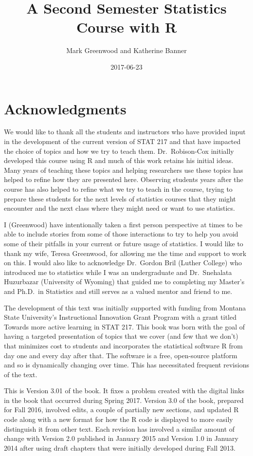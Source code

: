 \documentclass[]{book}
\title{A Second Semester Statistics Course with R}
\author{Mark Greenwood and Katherine Banner}
\date{2017-06-23}
\begin{document}
\maketitle

{
\setcounter{tocdepth}{1}
\tableofcontents
}
\chapter*{Acknowledgments}\label{acknowledgments}

We would like to thank all the students and instructors who have
provided input in the development of the current version of STAT 217 and
that have impacted the choice of topics and how we try to teach them.
Dr.~Robison-Cox initially developed this course using R and much of this
work retains his initial ideas. Many years of teaching these topics and
helping researchers use these topics has helped to refine how they are
presented here. Observing students years after the course has also
helped to refine what we try to teach in the course, trying to prepare
these students for the next levels of statistics courses that they might
encounter and the next class where they might need or want to use
statistics.

I (Greenwood) have intentionally taken a first person perspective at
times to be able to include stories from some of those interactions to
try to help you avoid some of their pitfalls in your current or future
usage of statistics. I would like to thank my wife, Teresa Greenwood,
for allowing me the time and support to work on this. I would also like
to acknowledge Dr.~Gordon Bril (Luther College) who introduced me to
statistics while I was an undergraduate and Dr.~Snehalata Huzurbazar
(University of Wyoming) that guided me to completing my Master's and
Ph.D.~in Statistics and still serves as a valued mentor and friend to
me.

The development of this text was initially supported with funding from
Montana State University's Instructional Innovation Grant Program with a
grant titled Towards more active learning in STAT 217. This book was
born with the goal of having a targeted presentation of topics that we
cover (and few that we don't) that minimizes cost to students and
incorporates the statistical software R from day one and every day after
that. The software is a free, open-source platform and so is dynamically
changing over time. This has necessitated frequent revisions of the
text.

This is Version 3.01 of the book. It fixes a problem created with the
digital links in the book that occurred during Spring 2017. Version 3.0
of the book, prepared for Fall 2016, involved edits, a couple of
partially new sections, and updated R code along with a new format for
how the R code is displayed to more easily distinguish it from other
text. Each revision has involved a similar amount of change with Version
2.0 published in January 2015 and Version 1.0 in January 2014 after
using draft chapters that were initially developed during Fall 2013.
\end{document}
